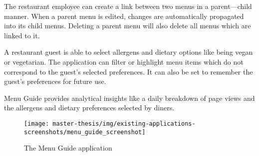  The restaurant employee can create a link between two menus in a parent---child manner.
  When a parent menu is edited, changes are automatically propagated into its child menus.
  Deleting a parent menu will also delete all menus which are linked to it.

  A restaurant guest is able to select allergens and dietary options like being vegan or vegetarian.
  The application can filter or highlight menu items which do not correspond to the guest's selected preferences.
  It can also be set to remember the guest's preferences for future use.

  Menu Guide provides analytical insights like a daily breakdown of page views and the allergens and dietary preferences selected by diners.

  \begin{figure}[h]
    \centering
    \texttt{[image: master-thesis/img/existing-applications-screenshots/menu\_guide\_screenshot]}
    \caption{The Menu Guide application}
  \end{figure}
